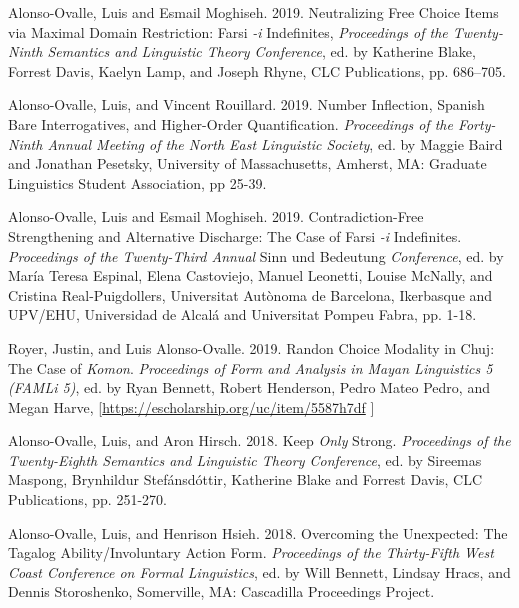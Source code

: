 \documentclass[11pt]{article}
\begin{document}
      Alonso-Ovalle, Luis and Esmail Moghiseh. 2019. Neutralizing Free Choice Items via Maximal Domain
Restriction: Farsi \textit{-i} Indefinites, \textit{Proceedings of the Twenty-Ninth Semantics and Linguistic Theory Conference}, ed. by Katherine Blake, Forrest Davis, Kaelyn Lamp, and Joseph Rhyne, CLC Publications, pp. 686–705. 
      
Alonso-Ovalle, Luis, and Vincent Rouillard. 2019. Number Inflection, Spanish Bare Interrogatives, and Higher-Order Quantification. \textit{Proceedings
of the Forty-Ninth Annual Meeting of the North East Linguistic Society}, ed. by Maggie Baird and Jonathan Pesetsky, University of Massachusetts, Amherst, MA: Graduate Linguistics Student Association, pp 25-39.
 
 Alonso-Ovalle, Luis and Esmail Moghiseh. 2019. Contradiction-Free Strengthening and Alternative Discharge: The Case of Farsi \textit{-i} Indefinites. \textit{Proceedings of the Twenty-Third Annual} Sinn und Bedeutung \textit{Conference}, ed. by Mar\'ia Teresa Espinal, Elena Castoviejo, Manuel Leonetti, Louise McNally, and Cristina Real-Puigdollers, Universitat Aut\`onoma de Barcelona, Ikerbasque and UPV/EHU, Universidad de Alcal\'a and Universitat Pompeu Fabra, pp. 1-18. %
      
 Royer, Justin, and Luis Alonso-Ovalle. 2019. Randon Choice Modality in Chuj: The Case of \textit{Komon}. \textit{Proceedings of Form and Analysis in Mayan Linguistics 5 (FAMLi 5)}, ed. by Ryan Bennett, Robert Henderson, Pedro Mateo Pedro, and Megan Harve, {\footnotesize [\href{https://escholarship.org/uc/item/5587h7df}{https://escholarship.org/uc/item/5587h7df} ]}
      
Alonso-Ovalle, Luis, and Aron Hirsch. 2018. Keep \textit{Only} Strong. \textit{Proceedings of the Twenty-Eighth Semantics and Linguistic Theory Conference}, ed. by Sireemas Maspong, Brynhildur Stef\'ansd\'ottir, Katherine Blake and Forrest Davis, CLC Publications, pp. 251-270. %
       
 Alonso-Ovalle, Luis, and Henrison Hsieh. 2018. Overcoming the Unexpected: The Tagalog Ability/Involuntary Action Form.  \textit{Proceedings of the Thirty-Fifth West Coast Conference on Formal Linguistics}, ed. by Will Bennett, Lindsay Hracs, and Dennis Storoshenko, Somerville, MA: Cascadilla Proceedings Project.      
      
\end{document}
